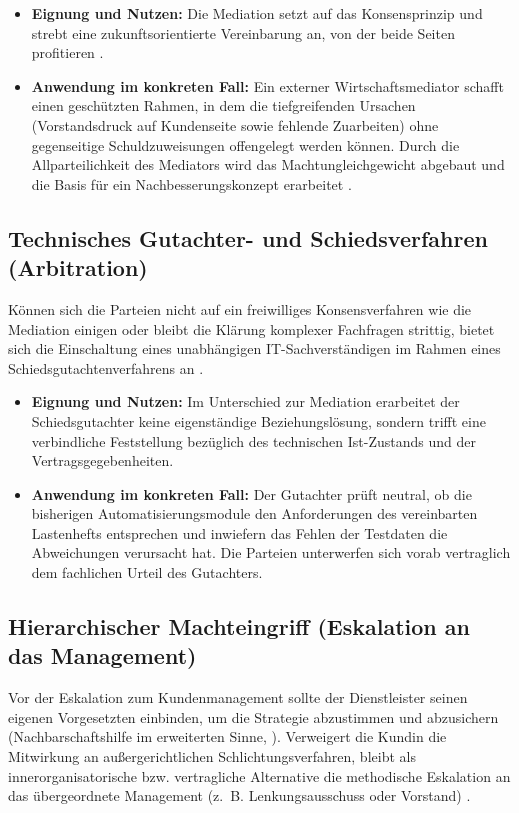 \begin{itemize}
    \item \textbf{Eignung und Nutzen:} Die Mediation setzt auf das Konsensprinzip und strebt eine zukunftsorientierte Vereinbarung an, von der beide Seiten profitieren \cite[S.~70--71]{5}.
    \item \textbf{Anwendung im konkreten Fall:} Ein externer Wirtschaftsmediator schafft einen geschützten Rahmen, in dem die tiefgreifenden Ursachen (Vorstandsdruck auf Kundenseite sowie fehlende Zuarbeiten) ohne gegenseitige Schuldzuweisungen offengelegt werden können. Durch die Allparteilichkeit des Mediators wird das Machtungleichgewicht abgebaut und die Basis für ein Nachbesserungskonzept erarbeitet \cite[S.~73--74]{5}.
\end{itemize}

\subsection{Technisches Gutachter- und Schiedsverfahren (Arbitration)}
Können sich die Parteien nicht auf ein freiwilliges Konsensverfahren wie die Mediation einigen oder bleibt die Klärung komplexer Fachfragen strittig, bietet sich die Einschaltung eines unabhängigen IT-Sachverständigen im Rahmen eines Schiedsgutachtenverfahrens an \cite[S.~63]{5}.

\begin{itemize}
    \item \textbf{Eignung und Nutzen:} Im Unterschied zur Mediation erarbeitet der Schiedsgutachter keine eigenständige Beziehungslösung, sondern trifft eine verbindliche Feststellung bezüglich des technischen Ist-Zustands und der Vertragsgegebenheiten.
    \item \textbf{Anwendung im konkreten Fall:} Der Gutachter prüft neutral, ob die bisherigen Automatisierungsmodule den Anforderungen des vereinbarten Lastenhefts entsprechen und inwiefern das Fehlen der Testdaten die Abweichungen verursacht hat. Die Parteien unterwerfen sich vorab vertraglich dem fachlichen Urteil des Gutachters.
\end{itemize}

\subsection{Hierarchischer Machteingriff (Eskalation an das Management)}
Vor der Eskalation zum Kundenmanagement sollte der Dienstleister seinen eigenen Vorgesetzten einbinden, um die Strategie abzustimmen und abzusichern (Nachbarschaftshilfe im erweiterten Sinne, \cite[S.~53--54]{5}).
Verweigert die Kundin die Mitwirkung an außergerichtlichen Schlichtungsverfahren, bleibt als innerorganisatorische bzw. vertragliche Alternative die methodische Eskalation an das übergeordnete Management (z.~B. Lenkungsausschuss oder Vorstand) \cite[S.~62--63]{5}.

